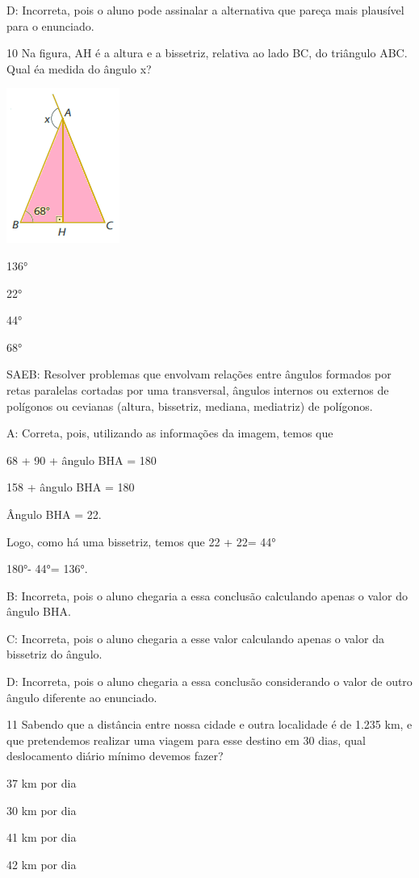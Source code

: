 {D: Incorreta, pois o aluno pode assinalar a alternativa que pareça mais
plausível para o enunciado.

\num{10} Na figura, AH é a altura e a bissetriz, relativa ao lado BC, do
triângulo ABC. Qual éa medida do ângulo x?

\includegraphics[width=1.45833in,height=2in]{./imgSAEB_8_MAT/media/image58.png}
\item 136°
\item 22°
\item 44°
\item 68°

SAEB: Resolver problemas que envolvam relações entre ângulos formados
por retas paralelas cortadas por uma transversal, ângulos internos ou
externos de polígonos ou cevianas (altura, bissetriz, mediana,
mediatriz) de polígonos.

A: Correta, pois, utilizando as informações da imagem, temos que

68 + 90 + ângulo BHA = 180

158 + ângulo BHA = 180

Ângulo BHA = 22.

Logo, como há uma bissetriz, temos que 22 + 22= 44°

180°- 44°= 136°.

B: Incorreta, pois o aluno chegaria a essa conclusão calculando apenas o
valor do ângulo BHA.

C: Incorreta, pois o aluno chegaria a esse valor calculando apenas o
valor da bissetriz do ângulo.

D: Incorreta, pois o aluno chegaria a essa conclusão considerando o
valor de outro ângulo diferente ao enunciado.

\num{11} Sabendo que a distância entre nossa cidade e outra localidade é de
1.235 km, e que pretendemos realizar uma viagem para esse destino em 30
dias, qual deslocamento diário mínimo devemos fazer?
\item 37 km por dia
\item 30 km por dia
\item 41 km por dia
\item 42 km por dia

}
